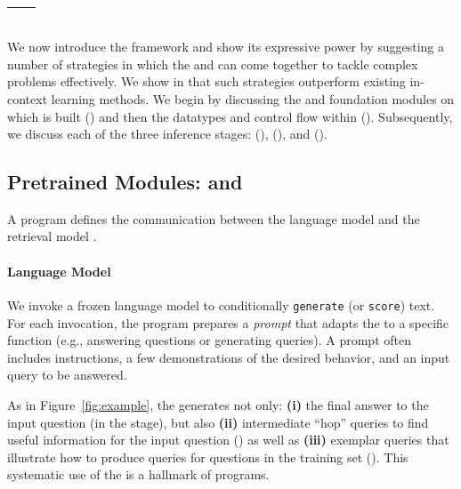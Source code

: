 \section{\demonstrate--\search--\predict} \label{section:dsp} \label{sec:dsp}

We now introduce the \DSP framework and show its expressive power by suggesting a number of strategies in which the \LM{} and \RM{} can come together to tackle complex problems effectively. We show in  that such strategies outperform existing in-context learning methods. We begin by discussing the \LM{} and \RM{} foundation modules on which \DSP is built () and then the datatypes and control flow within \DSP (). Subsequently, we discuss each of the three inference stages: \demonstrate (), \search (), and \predict ().








\subsection{Pretrained Modules: \LM{} and \RM{}}
\label{sec:dsp:modules}

A \DSP program defines the communication between the language model \LM{} and the retrieval model \RM{}.%

\vspace{-2mm}
\paragraph{Language Model} We invoke a frozen language model \LM{} to conditionally \texttt{generate} (or \texttt{score}) text. For each invocation, the program prepares a \textit{prompt} that adapts the \LM{} to a specific function (e.g., answering questions or generating queries). A prompt often includes instructions, a few demonstrations of the desired behavior, and an input query to be answered.

As in Figure~\ref{fig:example}, the \LM{} generates not only: \textbf{(i)} the final answer to the input question (in the \predict stage), but also \textbf{(ii)} intermediate ``hop'' queries to find useful information for the input question (\search)  as well as \textbf{(iii)} exemplar queries that illustrate how to produce queries for questions in the training set (\demonstrate). This systematic use of the \LM{} is a hallmark of \DSP programs.


